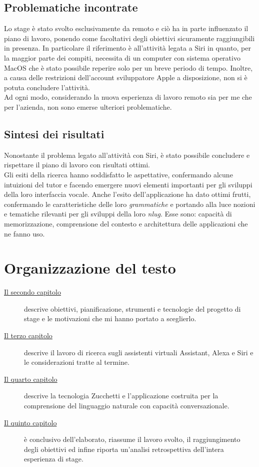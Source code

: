 \subsection{Problematiche incontrate}
Lo stage è stato svolto esclusivamente da remoto e ciò ha in parte influenzato il piano di lavoro, ponendo come facoltativi degli obiettivi sicuramente raggiungibili in presenza. In particolare il riferimento è all'attività legata a Siri in quanto, per la maggior parte dei compiti, necessita di un computer con sistema operativo MacOS che è stato possibile reperire solo per un breve periodo di tempo. Inoltre, a causa delle restrizioni dell'account sviluppatore Apple a disposizione, non si è potuta concludere l'attività. \\
Ad ogni modo, considerando la nuova esperienza di lavoro remoto sia per me che per l'azienda, non sono emerse ulteriori problematiche.
\subsection{Sintesi dei risultati}
Nonostante il problema legato all'attività con Siri, è stato possibile concludere e rispettare il piano di lavoro con risultati ottimi. \\
Gli esiti della ricerca hanno soddisfatto le aspettative, confermando alcune intuizioni del tutor e facendo emergere nuovi elementi importanti per gli sviluppi della loro interfaccia vocale. Anche l'esito dell'applicazione ha dato ottimi frutti, confermando le caratteristiche delle loro \emph{grammatiche} e portando alla luce nozioni e tematiche rilevanti per gli sviluppi della loro \emph{\gls{nlug}}. Esse sono: capacità di memorizzazione, comprensione del contesto e architettura delle applicazioni che ne fanno uso.
\section{Organizzazione del testo}

\begin{description}
    \item[{\hyperref[cap:lo-stage]{Il secondo capitolo}}] descrive obiettivi, pianificazione, strumenti e tecnologie del progetto di stage e le motivazioni che mi hanno portato a sceglierlo.
    
    \item[{\hyperref[cap:assistenti-virtuali]{Il terzo capitolo}}] descrive il lavoro di ricerca sugli assistenti virtuali Assistant, Alexa e Siri e le considerazioni tratte al termine.
    
    \item[{\hyperref[cap:applicazione]{Il quarto capitolo}}] descrive la tecnologia Zucchetti e l'applicazione costruita per la comprensione del linguaggio naturale con capacità conversazionale.
    
    \item[{\hyperref[cap:conclusione]{Il quinto capitolo}}] è conclusivo dell'elaborato, riassume il lavoro svolto, il raggiungimento degli obiettivi ed infine riporta un'analisi retrospettiva dell'intera esperienza di stage.
\end{description}


